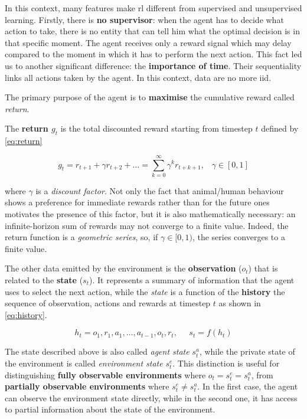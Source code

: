 In this context, many features make \gls{rl} different from supervised and unsupervised learning.
Firstly, there is \textbf{no supervisor}: when the agent has to decide what action to take, there is no entity that can tell him what the optimal decision is in that specific moment. The agent receives only a reward signal which may delay compared to the moment in which it has to perform the next action. 
This fact led us to another significant difference: the \textbf{importance of time}. Their sequentiality links all actions taken by the agent. In this context, data are no more \gls{iid}.

The primary purpose of the agent is to \textbf{maximise} the cumulative reward called \textit{return}.

The \textbf{return $g_t$} is the total discounted reward starting from timestep $t$ defined by \vref{eq:return}

\begin{equation} \label{eq:return}
	g_t = r_{t+1} + \gamma r_{t+2} + \dots = \sum_{k=0}^{\infty} \gamma^k r_{t+k+1}, \;\;\;\gamma \in [0,1]
\end{equation}

where $\gamma$ is a \textit{discount factor}. Not only the fact that animal/human behaviour shows a preference for immediate rewards rather than for the future ones motivates the presence of this factor, but it is also mathematically necessary: an infinite-horizon sum of rewards may not converge to a finite value. Indeed, the return function is a \textit{geometric series}, so, if $\gamma \in [0,1)$, the series converges to a finite value.


The other data emitted by the environment is the \textbf{observation} ($o_t$) that is related to the \textbf{state} ($s_t$). It represents a summary of information that the agent uses to select the next action, while the \textit{state} is a function of the \textbf{history} the sequence of observation, actions and rewards at timestep $t$ as shown in \vref{eq:history}.

\begin{equation}\label{eq:history}
h_t = o_1, r_1, a_1, \dots, a_{t-1}, o_{t}, r_t, \;\;\;\;\; s_t = f(h_t)
\end{equation}

The state described above is also called \textit{agent state} $s_t^a$, while the private state of the environment is called \textit{environment state} $s_t^e$. This distinction is useful for distinguishing \textbf{fully observable environments} where $o_t = s_t^e = s_t^a$, from \textbf{partially observable environments} where $s_t^e \neq s_t^a$.
In the first case, the agent can observe the environment state directly, while in the second one, it has access to partial information about the state of the environment.

